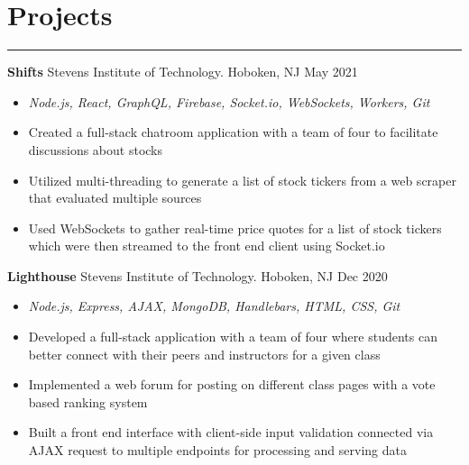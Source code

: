 \documentclass[10pt]{article}
\newcommand{\resumesection}[1]{\vspace{-0.2cm}\section*{#1}\vspace{-0.2cm}\hrule\vspace{0.2cm}}
\begin{document}
\resumesection{Projects}


\textbf{Shifts} Stevens Institute of Technology. Hoboken, NJ \hfill May 2021\par
\begin{itemize}
	\item \textit{Node.js, React, GraphQL, Firebase, Socket.io, WebSockets, Workers, Git} 
	\item Created a full-stack chatroom application with a team of four to facilitate discussions about stocks
	\item Utilized multi-threading to generate a list of stock tickers from a web scraper that evaluated multiple sources
	\item Used WebSockets to gather real-time price quotes for a list of stock tickers which were then streamed to the front end client using Socket.io
\end{itemize}

\textbf{Lighthouse} Stevens Institute of Technology. Hoboken, NJ \hfill Dec 2020\par
\begin{itemize}
	\item \textit{Node.js, Express, AJAX, MongoDB, Handlebars, HTML, CSS, Git}
	\item Developed a full-stack application with a team of four where students can better connect with their peers and instructors for a given class
	\item Implemented a web forum for posting on different class pages with a vote based ranking system
	\item Built a front end interface with client-side input validation connected via AJAX request to multiple endpoints for processing and serving data
\end{itemize}
\end{document}
